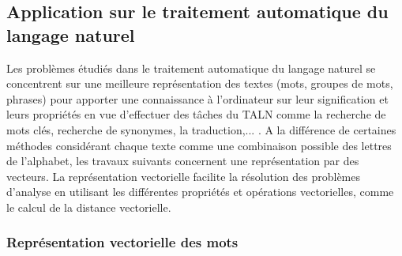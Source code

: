  
\smallskip

\subsection{Application sur le traitement automatique du langage naturel} \label{taln}
 Les problèmes étudiés dans le traitement automatique du langage naturel se concentrent sur une meilleure représentation des textes (mots, groupes de mots, phrases) pour apporter une connaissance à l'ordinateur sur leur signification et leurs propriétés en vue d'effectuer des tâches du TALN comme la recherche de mots clés, recherche de synonymes, la traduction,... . A la différence de certaines méthodes considérant chaque texte comme une combinaison possible des lettres de l'alphabet, les travaux suivants concernent une représentation par des vecteurs.  La représentation vectorielle facilite la résolution des problèmes d'analyse en utilisant les différentes propriétés et opérations vectorielles, comme le calcul de la distance vectorielle. \\

\subsubsection{Représentation vectorielle des mots}

